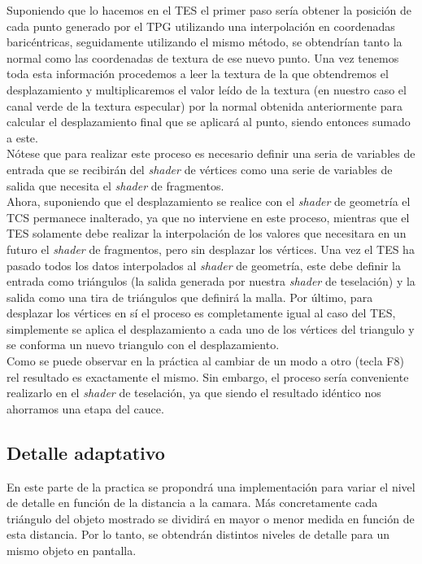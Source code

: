 \documentclass[10pt,oneside,a4paper]{article}
\begin{document}
Suponiendo que lo hacemos en el TES el primer paso sería obtener la posición de cada punto generado por el TPG utilizando una interpolación en coordenadas baricéntricas, seguidamente utilizando el mismo método, se obtendrían tanto la normal como las coordenadas de textura de ese nuevo punto.
Una vez tenemos toda esta información procedemos a leer la textura de la que obtendremos el desplazamiento y multiplicaremos el valor leído de la textura (en nuestro caso el canal verde de la textura especular) por la normal obtenida anteriormente para calcular el desplazamiento final que se aplicará al punto, siendo entonces sumado a este.\\

Nótese que para realizar este proceso es necesario definir una seria de variables de entrada que se recibirán del \textit{shader} de vértices como una serie de variables de salida que necesita el \textit{shader} de fragmentos. \\

Ahora, suponiendo que el desplazamiento se realice con el \textit{shader} de geometría el TCS permanece inalterado, ya que no interviene en este proceso, mientras que el TES solamente debe realizar la interpolación de los valores que necesitara en un futuro el \textit{shader} de fragmentos, pero sin desplazar los vértices. Una vez el TES ha pasado todos los datos interpolados al \textit{shader} de geometría, este debe definir la entrada como triángulos (la salida generada por nuestra \textit{shader} de teselación) y la salida como una tira de triángulos que definirá la malla.
Por último, para desplazar los vértices en sí el proceso es completamente igual al caso del TES, simplemente se aplica el desplazamiento a cada uno de los vértices del triangulo y se conforma un nuevo triangulo con el desplazamiento.\\

Como se puede observar en la práctica al cambiar de un modo a otro (tecla F8) rel resultado es exactamente el mismo. Sin embargo, el proceso sería conveniente realizarlo en el \textit{shader} de teselación, ya que siendo el resultado idéntico nos ahorramos una etapa del cauce. 


\subsection{Detalle adaptativo}
En este parte de la practica se propondrá una implementación para variar el nivel de detalle en función de la distancia a la camara. Más concretamente cada triángulo del objeto mostrado se dividirá en mayor o menor medida en función de esta distancia. Por lo tanto, se obtendrán distintos niveles de detalle para un mismo objeto en pantalla.
\end{document}
